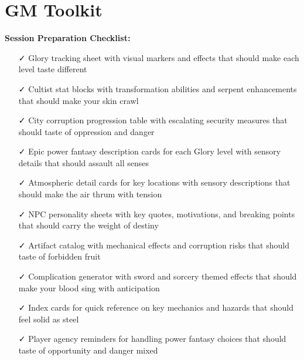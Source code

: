 \documentclass[11pt]{article}
\begin{document}
\section{GM Toolkit}

\textbf{Session Preparation Checklist:}
\begin{itemize}
\item [✓] Glory tracking sheet with visual markers and effects that should make each level taste different
\item [✓] Cultist stat blocks with transformation abilities and serpent enhancements that should make your skin crawl
\item [✓] City corruption progression table with escalating security measures that should taste of oppression and danger
\item [✓] Epic power fantasy description cards for each Glory level with sensory details that should assault all senses
\item [✓] Atmospheric detail cards for key locations with sensory descriptions that should make the air thrum with tension
\item [✓] NPC personality sheets with key quotes, motivations, and breaking points that should carry the weight of destiny
\item [✓] Artifact catalog with mechanical effects and corruption risks that should taste of forbidden fruit
\item [✓] Complication generator with sword and sorcery themed effects that should make your blood sing with anticipation
\item [✓] Index cards for quick reference on key mechanics and hazards that should feel solid as steel
\item [✓] Player agency reminders for handling power fantasy choices that should taste of opportunity and danger mixed
\end{itemize}
\end{document}
